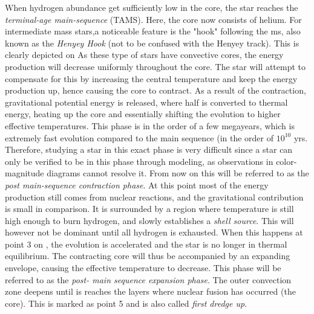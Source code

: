 When hydrogen abundance get sufficiently low in the core, the star reaches the \textit{terminal-age main-sequence} (TAMS). Here, the core now consists of helium.
For intermediate mass stars,a noticeable feature is the "hook" following the ms, also known as the \textit{Henyey Hook} (not to be confused with the Henyey track). This is clearly depicted on  As these type of stars have convective cores, the energy production will decrease uniformly throughout the core. The star will attempt to compensate for this by increasing the central temperature and keep the energy production up, hence causing the core to contract. As a result of the contraction, gravitational potential energy is released, where half is converted to thermal energy, heating up the core and essentially shifting the evolution to higher effective temperatures. This phase is in the order of a few megayears, which is extremely fast evolution compared to the main sequence (in the order of $10^{10}$ yrs. Therefore, studying a star in this exact phase is very difficult since a star can only be verified to be in this phase through modeling, as observations in color-magnitude diagrams cannot resolve it. From now on this will be referred to as the \textit{post main-sequence contraction phase}. At this point most of the energy production still comes from nuclear reactions, and the gravitational contribution is small in comparison.  It is surrounded by a region where temperature is still high enough to burn hydrogen, and slowly establishes a \textit{shell source}. This will however not be dominant until all hydrogen is exhausted. When this happens at point 3 on , the evolution is accelerated and the star is no longer in thermal equilibrium. The contracting core will thus be accompanied by an expanding envelope, causing the effective temperature to decrease. This phase will be referred to as the \textit{post- main sequence expansion phase}. The outer convection zone deepens until is reaches the layers where nuclear fusion has occurred (the core). This is marked as point 5 and is also called \textit{first dredge up}. 

